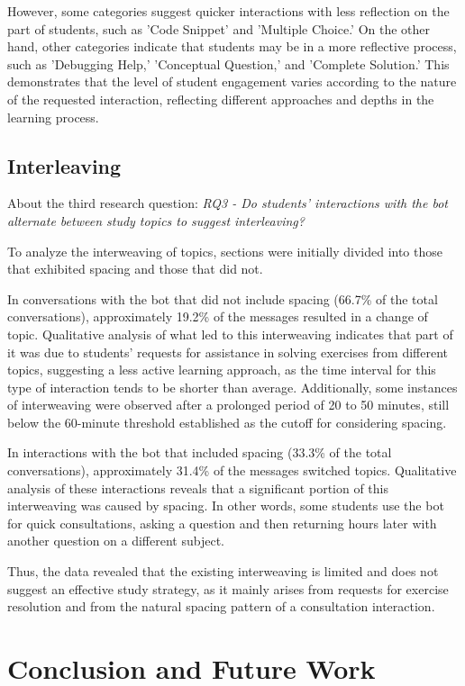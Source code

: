 \documentclass[a4paper,twoside]{article}
\begin{document}
However, some categories suggest quicker interactions with less reflection on
the part of students, such as 'Code Snippet' and 'Multiple Choice.' On the other
hand, other categories indicate that students may be in a more reflective
process, such as 'Debugging Help,' 'Conceptual Question,' and 'Complete
Solution.' This demonstrates that the level of student engagement varies
according to the nature of the requested interaction, reflecting different
approaches and depths in the learning process.

\subsection{Interleaving}

About the third research question: \textit{RQ3 - Do students' interactions with
the bot alternate between study topics to suggest interleaving?}

To analyze the interweaving of topics, sections were initially divided into
those that exhibited spacing and those that did not.

In conversations with the bot that did not include spacing (66.7\% of the total
conversations), approximately 19.2\% of the messages resulted in a change of
topic. Qualitative analysis of what led to this interweaving indicates that
part of it was due to students' requests for assistance in solving exercises
from different topics, suggesting a less active learning approach, as the time
interval for this type of interaction tends to be shorter than average.
Additionally, some instances of interweaving were observed after a prolonged
period of 20 to 50 minutes, still below the 60-minute threshold established as
the cutoff for considering spacing.

In interactions with the bot that included spacing (33.3\% of the total
conversations), approximately 31.4\% of the messages switched topics.
Qualitative analysis of these interactions reveals that a significant portion
of this interweaving was caused by spacing. In other words, some students use
the bot for quick consultations, asking a question and then returning hours
later with another question on a different subject.

Thus, the data revealed that the existing interweaving is limited and does not
suggest an effective study strategy, as it mainly arises from requests for
exercise resolution and from the natural spacing pattern of a consultation
interaction.

\section{Conclusion and Future Work}
\end{document}
